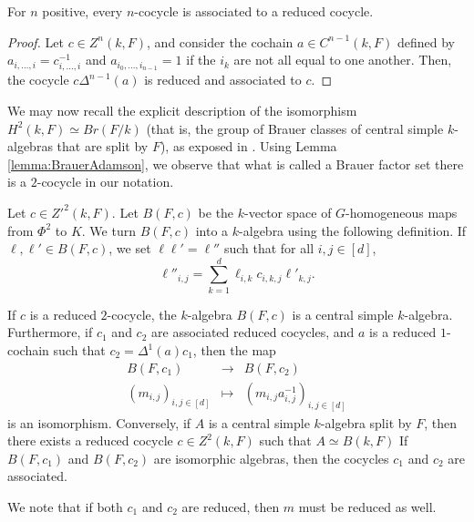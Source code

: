 \begin{prop}
    For \(n\) positive, every \(n\)-cocycle is associated to a reduced cocycle.
\end{prop}

\begin{proof}
    Let \(c \in Z^n(k,F)\), and consider the cochain \(a \in C^{n-1}(k,F)\) defined by \(a_{i,\hdots,i} = c_{i,\hdots,i}^{-1}\) and \(a_{i_0,\hdots,i_{n-1}} = 1\) if the \(i_k\) are not all equal to one another. Then, the cocycle \(c \Delta^{n-1}(a)\) is reduced and associated to \(c\).
\end{proof}

We may now recall the explicit description of the isomorphism \(H^2(k,F) \simeq Br(F/k)\) (that is, the group of Brauer classes of central simple \(k\)-algebras that are split by \(F\)), as exposed in \cite[Chapter 2]{jacobson2009finite}. Using Lemma \ref{lemma:BrauerAdamson}, we observe that what is called a Brauer factor set there is a \(2\)-cocycle in our notation.

\begin{definition}\label{def:BrauerCSA}
    Let \(c \in Z'^2(k,F)\). Let \(B(F,c)\) be the \(k\)-vector space of \(G\)-homogeneous maps from \(\Phi^2\) to \(K\). We turn \(B(F,c)\) into a \(k\)-algebra using the following definition. If \(\ell,\ell' \in B(F,c)\), we set \(\ell \ell' = \ell''\) such that for all \(i,j \in [d]\),
    \[\ell''_{i,j} = \sum_{k=1}^d \ell_{i,k} c_{i,k,j} \ell'_{k,j}.\]
\end{definition}

\begin{theorem}\label{thm:BrauerFSAssociated}
    If \(c\) is a reduced \(2\)-cocycle, the \(k\)-algebra \(B(F,c)\) is a central simple \(k\)-algebra. Furthermore, if \(c_1\) and \(c_2\) are associated reduced cocycles, and \(a\) is a reduced \(1\)-cochain such that \(c_2 = \Delta^1(a) c_1\), then the map
    \[\begin{array}{ccl} B(F,c_1) &\to &B(F,c_2) \\ (m_{i,j})_{i,j \in [d]} &\mapsto &(m_{i,j}a_{i,j}^{-1})_{i,j \in [d]}\end{array}\]
    is an isomorphism. Conversely, if \(A\) is a central simple \(k\)-algebra split by \(F\), then there exists a reduced cocycle \(c \in Z^2(k,F)\) such that \(A \simeq B(k,F)\) If \(B(F,c_1)\) and \(B(F,c_2)\) are isomorphic algebras, then the cocycles \(c_1\) and \(c_2\) are associated.
\end{theorem}

\begin{remark}\label{rem:ReducedAssociated}
    We note that if both \(c_1\) and \(c_2\) are reduced, then \(m\) must be reduced as well.
\end{remark}

